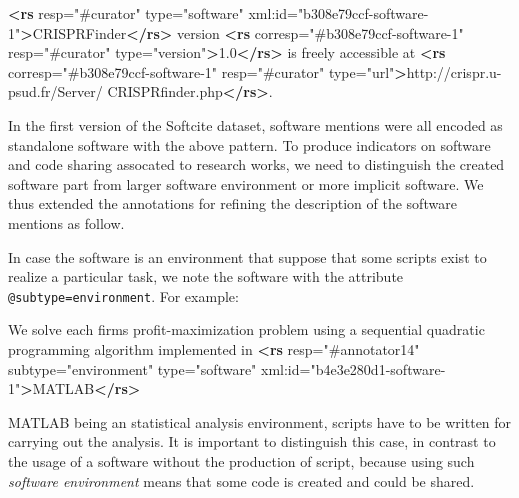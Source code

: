 \documentclass[
]{article}
\newenvironment{Shaded}{}{}
\newcommand{\KeywordTok}[1]{\textcolor[rgb]{0.00,0.44,0.13}{\textbf{#1}}}
\newcommand{\NormalTok}[1]{#1}
\newcommand{\OtherTok}[1]{\textcolor[rgb]{0.00,0.44,0.13}{#1}}
\newcommand{\StringTok}[1]{\textcolor[rgb]{0.25,0.44,0.63}{#1}}
\begin{document}
\begin{Shaded}
\begin{Highlighting}[]
 \KeywordTok{\textless{}rs}\OtherTok{ resp=}\StringTok{"\#curator"}\OtherTok{ type=}\StringTok{"software"}\OtherTok{ xml:id=}\StringTok{"b308e79ccf{-}software{-}1"}\KeywordTok{\textgreater{}}\NormalTok{CRISPRFinder}\KeywordTok{\textless{}/rs\textgreater{}} 
\NormalTok{ version }\KeywordTok{\textless{}rs}\OtherTok{ corresp=}\StringTok{"\#b308e79ccf{-}software{-}1"}\OtherTok{ resp=}\StringTok{"\#curator"}\OtherTok{ type=}\StringTok{"version"}\KeywordTok{\textgreater{}}\NormalTok{1.0}\KeywordTok{\textless{}/rs\textgreater{}} 
\NormalTok{ is freely accessible at }\KeywordTok{\textless{}rs}\OtherTok{ corresp=}\StringTok{"\#b308e79ccf{-}software{-}1"}\OtherTok{ resp=}\StringTok{"\#curator"} 
\OtherTok{ type=}\StringTok{"url"}\KeywordTok{\textgreater{}}\NormalTok{http://crispr.u{-}psud.fr/Server/ CRISPRfinder.php}\KeywordTok{\textless{}/rs\textgreater{}}\NormalTok{.}
\end{Highlighting}
\end{Shaded}

In the first version of the Softcite dataset, software mentions were all
encoded as standalone software with the above pattern. To produce
indicators on software and code sharing assocated to research works, we
need to distinguish the created software part from larger software
environment or more implicit software. We thus extended the annotations
for refining the description of the software mentions as follow.

In case the software is an environment that suppose that some scripts
exist to realize a particular task, we note the software with the
attribute \texttt{@subtype=environment}. For example:

\begin{Shaded}
\begin{Highlighting}[]
\NormalTok{We solve each firm\textquotesingle{}s profit{-}maximization problem using a sequential quadratic }
\NormalTok{programming algorithm implemented in }\KeywordTok{\textless{}rs}\OtherTok{ resp=}\StringTok{"\#annotator14"}\OtherTok{ subtype=}\StringTok{"environment"} 
\OtherTok{type=}\StringTok{"software"}\OtherTok{ xml:id=}\StringTok{"b4e3e280d1{-}software{-}1"}\KeywordTok{\textgreater{}}\NormalTok{MATLAB}\KeywordTok{\textless{}/rs\textgreater{}} 
\end{Highlighting}
\end{Shaded}

MATLAB being an statistical analysis environment, scripts have to be
written for carrying out the analysis. It is important to distinguish
this case, in contrast to the usage of a software without the production
of script, because using such \emph{software environment} means that
some code is created and could be shared.
\end{document}
